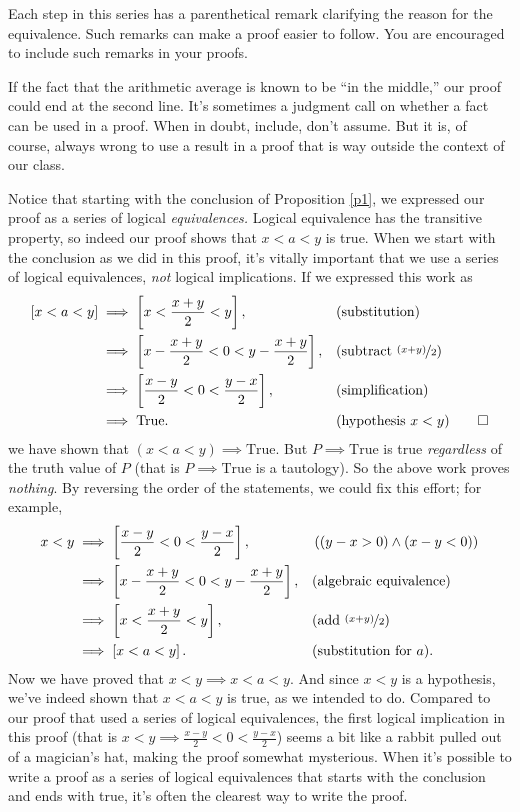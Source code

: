 \documentclass[12pt,fleqn]{article}
\newcommand{\true}{\mathrm{True}}
\begin{document}
Each step in this series has a parenthetical remark clarifying the reason for the equivalence. 
Such remarks can make a proof easier to follow. You are encouraged
to include such remarks in your proofs.

If the fact that the arithmetic average is known to be ``in the middle,'' our proof could end at 
the second line. It's sometimes a judgment call on whether a fact can be used in a proof. When in doubt, include, don't assume.
But it is, of course, always wrong to use a result in a proof  that is way outside the context of our class.

Notice that starting with the conclusion of Proposition \ref{p1}, we expressed our proof as a series of logical \emph{equivalences.}  Logical
equivalence has the transitive property, so indeed our proof shows that $x < a < y$ is true.  
When we start with the conclusion as we did in this proof, it's vitally important that we use a series of  logical equivalences, \emph{not}
logical implications. If we expressed this work as
 \begin{align*}
      \left[ x < a < y \right] 
          &\implies \left[ x < \frac{x+y}{2} < y \right], &&\text{(substitution)} \\
          & \implies  \left[ x - \frac{x+y}{2} < 0 < y - \frac{x+y}{2}  \right], &&\text{(subtract $\nicefrac{(x+y)}{2}$)} \\
          & \implies  \left[ \frac{x-y}{2} < 0 < \frac{y-x}{2}  \right], &&\text{(simplification)} \\
          & \implies \true. && \text{(hypothesis $x < y$)} \qedhere
    \end{align*} 
we have shown that  $(x < a < y) \implies \true$. But $P \implies \true$ is
true \emph{regardless} of the truth value of $P$ (that is $P \implies \true$ is a 
tautology). So the above work proves \emph{nothing}. By reversing the order of the statements,
we could fix this effort; for example,
 \begin{align*}
    x < y  &\implies  \left[ \frac{x-y}{2} < 0 < \frac{y-x}{2}  \right], && \left((y-x > 0) \land  (x-y < 0) \right) \\
             &\implies   \left[ x - \frac{x+y}{2} < 0 < y - \frac{x+y}{2}  \right], &&\text{(algebraic equivalence)} \\
             &\implies \left[ x < \frac{x+y}{2} < y  \right], &&\text{(add $\nicefrac{(x+y)}{2}$)} \\
             &\implies \left[ x < a < y  \right].  &&\text{(substitution for $a$)}.
 \end{align*} 
Now we have proved that $x < y \implies x < a < y  $. And since $x < y$ is a hypothesis, we've indeed shown that $ x < a < y $ is true,
as we intended to do. Compared to our proof that used a series of logical equivalences,  the first logical implication in this proof 
(that is $x < y \implies 
 \frac{x-y}{2} < 0 < \frac{y-x}{2} $) seems a bit like a rabbit pulled out of a magician's hat, making the proof somewhat mysterious.
 When it's possible to write a proof as a series of logical equivalences that starts with the conclusion and ends with true, it's often 
 the clearest way to write the proof. 
\end{document}
